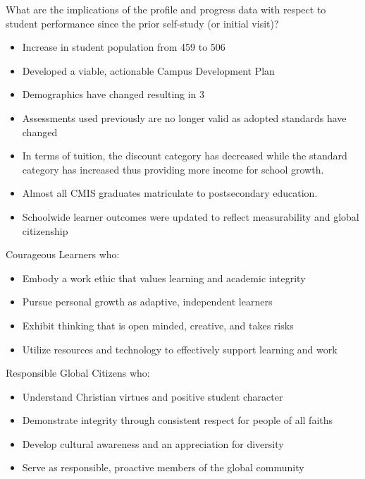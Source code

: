 
What are the implications of the profile and progress data with respect to student performance since the prior self-study (or initial visit)?

\begin{itemize}
\item Increase in student population from 459 to 506
\item Developed a viable, actionable Campus Development Plan
\item Demographics have changed resulting in 3%
\item Assessments used previously are no longer valid as adopted standards have changed
\item In terms of tuition, the discount category has decreased while the standard category has increased thus providing more income for school growth.
\item Almost all CMIS graduates matriculate to postsecondary education. 
\item Schoolwide learner outcomes were updated to reflect measurability and global citizenship
\end{itemize}

Courageous Learners who: 
\begin{itemize}
\item Embody a work ethic that values learning and academic integrity
\item Pursue personal growth as adaptive, independent learners
\item Exhibit thinking that is open minded, creative, and takes risks
\item Utilize resources and technology to effectively support learning and work
\end{itemize}

Responsible Global Citizens who:
\begin{itemize}
\item Understand Christian virtues and positive student character 
\item Demonstrate integrity through consistent respect for people of all faiths
\item Develop cultural awareness and an appreciation for diversity
\item Serve as responsible, proactive members of the global community
\end{itemize}

